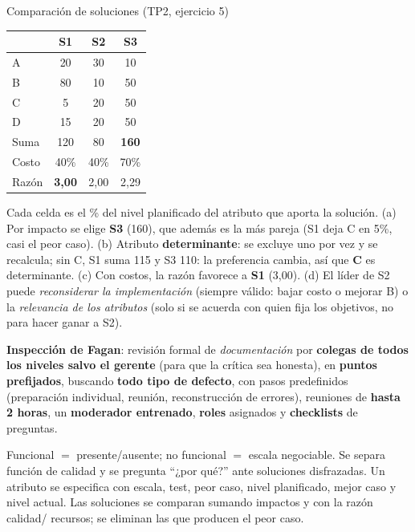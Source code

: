 \documentclass[11pt,a4paper]{article}
\begin{document}
\begin{ejemplo}{Comparación de soluciones (TP2, ejercicio 5)}
\small
\begin{minipage}[t]{0.38\textwidth}\centering
\begin{tabular}{@{}lccc@{}}
\toprule
 & S1 & S2 & S3\\
\midrule
A & 20 & 30 & 10\\
B & 80 & 10 & 50\\
C & 5 & 20 & 50\\
D & 15 & 20 & 50\\
\midrule
Suma & 120 & 80 & \textbf{160}\\
Costo & 40\% & 40\% & 70\%\\
Razón & \textbf{3,00} & 2,00 & 2,29\\
\bottomrule
\end{tabular}
\end{minipage}\hfill
\begin{minipage}[t]{0.6\textwidth}
Cada celda es el \% del nivel planificado del atributo que aporta la solución.
(a) Por impacto se elige \textbf{S3} (160), que además es la más pareja (S1 deja C en 5\%, casi el peor caso).
(b) Atributo \textbf{determinante}: se excluye uno por vez y se recalcula; sin C, S1 suma 115 y S3 110: la
preferencia cambia, así que \textbf{C} es determinante.
(c) Con costos, la razón favorece a \textbf{S1} (3,00).
(d) El líder de S2 puede \emph{reconsiderar la implementación} (siempre válido: bajar costo o mejorar B) o la
\emph{relevancia de los atributos} (solo si se acuerda con quien fija los objetivos, no para hacer ganar a S2).
\end{minipage}
\end{ejemplo}

\textbf{Inspección de Fagan}: revisión formal de \emph{documentación} por \textbf{colegas de todos los niveles
salvo el gerente} (para que la crítica sea honesta), en \textbf{puntos prefijados}, buscando \textbf{todo tipo
de defecto}, con pasos predefinidos (preparación individual, reunión, reconstrucción de errores), reuniones de
\textbf{hasta 2 horas}, un \textbf{moderador entrenado}, \textbf{roles} asignados y \textbf{checklists} de
preguntas.

\begin{enresumen}
Funcional $=$ presente/ausente; no funcional $=$ escala negociable. Se separa función de calidad y se pregunta
``¿por qué?'' ante soluciones disfrazadas. Un atributo se especifica con escala, test, peor caso, nivel
planificado, mejor caso y nivel actual. Las soluciones se comparan sumando impactos y con la razón calidad/
recursos; se eliminan las que producen el peor caso.
\end{enresumen}
\end{document}
